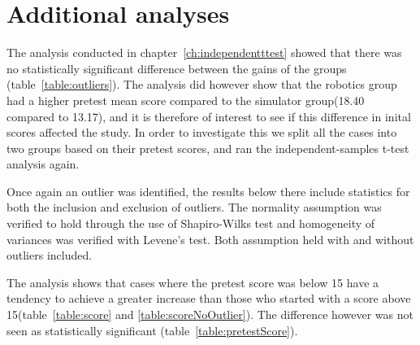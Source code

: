 \chapter{Additional analyses}\label{ch:additionalTests}
The analysis conducted in chapter~\ref{ch:independentttest} showed that there was no statistically significant difference between the gains of the groups (table~\ref{table:outliers}). 
The analysis did however show that the robotics group had a higher pretest mean score compared to the simulator group(18.40 compared to 13.17), and it is therefore of interest to see if this difference in inital scores affected the study.
In order to investigate this we split all the cases into two groups based on their pretest scores, and ran the independent-samples t-test analysis again.

\bigskip\noindent
Once again an outlier was identified, the results below there include statistics for both the inclusion and exclusion of outliers. The normality assumption was verified to hold through the use of Shapiro-Wilks test and homogeneity of variances was verified with Levene's test. Both assumption held with and without outliers included.

\bigskip\noindent
The analysis shows that cases where the pretest score was below 15 have a tendency to achieve a greater increase than those who started with a score above 15(table~\ref{table:score} and \ref{table:scoreNoOutlier}). The difference however was not seen as statistically significant (table~\ref{table:pretestScore}).


